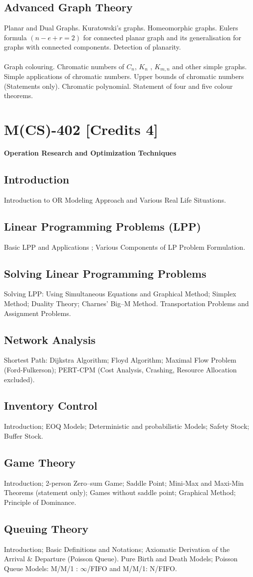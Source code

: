 \documentclass[12pt]{article}
\begin{document}
\subsection{Advanced Graph Theory}
Planar and Dual Graphs. Kuratowski’s graphs. Homeomorphic graphs. Eulers formula $(n-e+r=2)$ for connected planar graph and its generalisation for graphs with connected components. Detection of planarity.\\ \\
Graph colouring. Chromatic numbers of $C_n$, $K_n$ , $K_{m,n}$ and other simple graphs. Simple applications of chromatic numbers. Upper bounds of chromatic numbers (Statements only). Chromatic polynomial. Statement of four and five
colour theorems.

\section{M(CS)-402 [Credits 4]}
\textbf{Operation Research and Optimization Techniques}
\subsection{Introduction}
Introduction to OR Modeling Approach and Various Real Life Situations.
\subsection{Linear Programming Problems (LPP)}
Basic LPP and Applications ; Various Components of LP Problem Formulation.
\subsection{Solving Linear Programming Problems}
Solving LPP: Using Simultaneous Equations and Graphical Method; Simplex Method; Duality Theory; Charnes’ Big–M Method. Transportation Problems and Assignment Problems.
\subsection{Network Analysis}
Shortest Path: Dijkstra Algorithm; Floyd Algorithm; Maximal Flow Problem (Ford-Fulkerson); PERT-CPM (Cost Analysis, Crashing, Resource Allocation excluded). 
\subsection{Inventory Control}
Introduction; EOQ Models; Deterministic and probabilistic Models; Safety Stock; Buffer Stock.
\subsection{Game Theory}
Introduction; 2-person Zero–sum Game; Saddle Point; Mini-Max and Maxi-Min Theorems (statement only); Games without saddle point; Graphical Method; Principle of Dominance.
\subsection{Queuing Theory}
Introduction; Basic Definitions and Notations; Axiomatic Derivation of the Arrival \& Departure (Poisson Queue). Pure Birth and Death Models; Poisson Queue Models: M/M/1 : $\infty$/FIFO and M/M/1: N/FIFO.
\end{document}

